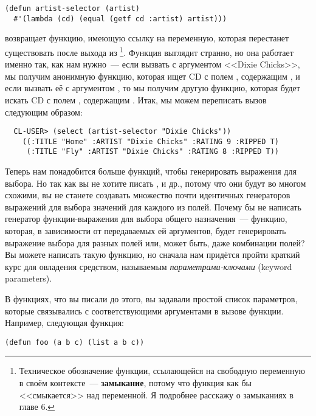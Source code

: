 \begin{lstlisting}
(defun artist-selector (artist)
  #'(lambda (cd) (equal (getf cd :artist) artist)))
\end{lstlisting}

 возвращает функцию, имеющую ссылку на переменную, которая
перестанет существовать после выхода из \footnote{Техническое
  обозначение функции, ссылающейся на свободную переменную в своём контексте~---
  \textbf{замыкание}, потому что функция как бы <<смыкается>> над переменной. Я подробнее
  расскажу о замыканиях в главе 6.}. Функция выглядит странно, но она работает именно так,
как нам нужно~--- если вызвать  с аргументом <<Dixie Chicks>>, мы
получим анонимную функцию, которая ищет CD с полем , содержащим , и если вызвать её с аргументом , то мы получим другую функцию,
которая будет искать CD с полем , содержащим . Итак, мы можем
переписать вызов  следующим образом:

\begin{verbatim}
  CL-USER> (select (artist-selector "Dixie Chicks"))
    ((:TITLE "Home" :ARTIST "Dixie Chicks" :RATING 9 :RIPPED T)
     (:TITLE "Fly" :ARTIST "Dixie Chicks" :RATING 8 :RIPPED T))
\end{verbatim}

Теперь нам понадобится больше функций, чтобы генерировать выражения для выбора. Но так как
вы не хотите писать ,  и др., потому что они
будут во многом схожими, вы не станете создавать множество почти идентичных генераторов
выражений для выбора значений для каждого из полей. Почему бы не написать генератор
функции-выражения для выбора общего назначения~--- функцию, которая, в зависимости от
передаваемых ей аргументов, будет генерировать выражение выбора для разных полей или,
может быть, даже комбинации полей? Вы можете написать такую функцию, но сначала нам
придётся пройти краткий курс для овладения средством, называемым
\textit{параметрами-ключами} (keyword parameters).

В функциях, что вы писали до этого, вы задавали простой список параметров, которые
связывались с соответствующими аргументами в вызове функции. Например, следующая функция:

\begin{lstlisting}
(defun foo (a b c) (list a b c))
\end{lstlisting}

